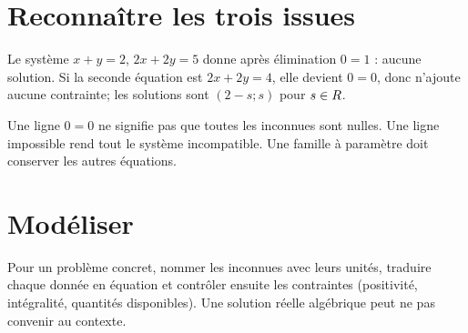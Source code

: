 \section{Reconnaître les trois issues}
\begin{exemple}
Le système $x+y=2$, $2x+2y=5$ donne après élimination $0=1$ : aucune solution. Si la seconde équation est $2x+2y=4$, elle devient $0=0$, donc n’ajoute aucune contrainte; les solutions sont $(2-s;s)$ pour $s\in R$.
\end{exemple}
\begin{avertissement}Une ligne $0=0$ ne signifie pas que toutes les inconnues sont nulles. Une ligne impossible rend tout le système incompatible. Une famille à paramètre doit conserver les autres équations.\end{avertissement}
\section{Modéliser}
Pour un problème concret, nommer les inconnues avec leurs unités, traduire chaque donnée en équation et contrôler ensuite les contraintes (positivité, intégralité, quantités disponibles). Une solution réelle algébrique peut ne pas convenir au contexte.



